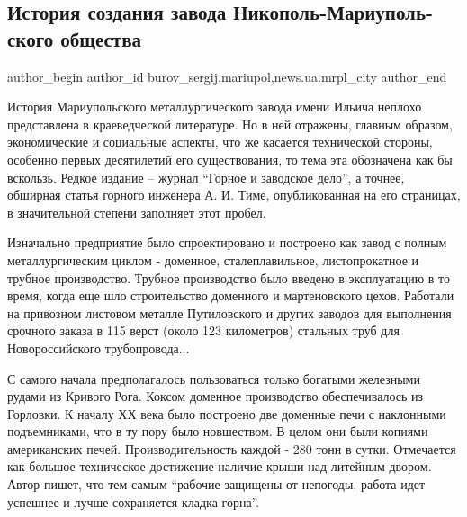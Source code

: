  
 
 
 
 
 
\subsection{История создания завода Никополь-Мариуполь\hyp{}ского общества}
\label{sec:19_01_2017.stz.news.ua.mrpl_city.1.istoria_sozdania_zavoda_nikopol_mariupol_obschestva}
 
\ifcmt
 author_begin
   author_id burov_sergij.mariupol,news.ua.mrpl_city
 author_end
\fi

История Мариупольского металлургического завода имени Ильича неплохо
представлена в краеведческой литературе. Но в ней отражены, главным образом,
экономические и социальные аспекты, что же касается технической стороны,
особенно первых десятилетий его существования, то тема эта обозначена как бы
вскользь. Редкое издание – журнал \enquote{Горное и заводское дело}, а точнее, обширная
статья горного инженера А. И. Тиме, опубликованная на его страницах, в
значительной степени заполняет этот пробел.


Изначально предприятие было спроектировано и построено как завод с полным
металлургическим циклом -  доменное, сталеплавильное, листопрокатное и трубное
производство. Трубное производство было введено в эксплуатацию в то время,
когда еще шло строительство доменного и мартеновского цехов. Работали на
привозном листовом металле Путиловского и других заводов для выполнения
срочного заказа в 115 верст (около 123 километров) стальных труб для
Новороссийского трубопровода...


С самого начала предполагалось пользоваться только богатыми железными рудами из
Кривого Рога. Коксом доменное производство обеспечивалось из Горловки. К началу
ХХ века было построено две доменные печи с наклонными подъемниками, что в ту
пору было новшеством. В целом они были копиями американских печей.
Производительность каждой -  280 тонн в сутки. Отмечается как большое
техническое достижение наличие крыши над литейным двором. Автор пишет, что тем
самым \enquote{рабочие защищены от непогоды, работа идет успешнее и лучше сохраняется
кладка горна}.

